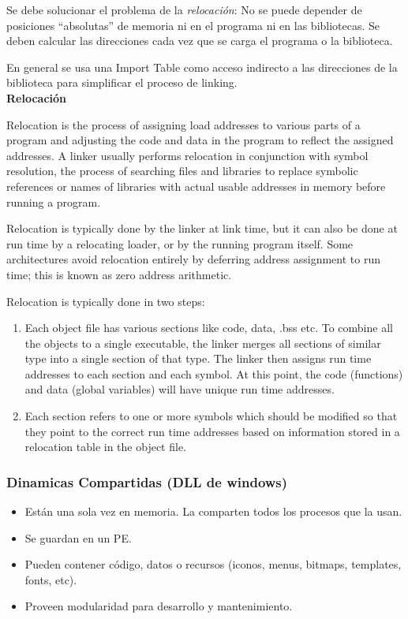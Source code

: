 \documentclass[a4paper, twoside]{article}
\begin{document}
Se debe solucionar el problema de la \emph{relocación}: No se puede depender de posiciones ``absolutas'' de memoria ni en el programa ni en las bibliotecas. Se deben calcular las direcciones cada vez que se carga el programa o la biblioteca.

En general se usa una Import Table como acceso indirecto a las direcciones de la biblioteca para simplificar el proceso de linking.\\

\textbf{Relocación}

Relocation is the process of assigning load addresses to various parts of a program and adjusting the code and data in the program to reflect the assigned addresses. A linker usually performs relocation in conjunction with symbol resolution, the process of searching files and libraries to replace symbolic references or names of libraries with actual usable addresses in memory before running a program.

Relocation is typically done by the linker at link time, but it can also be done at run time by a relocating loader, or by the running program itself. Some architectures avoid relocation entirely by deferring address assignment to run time; this is known as zero address arithmetic.

Relocation is typically done in two steps:
\begin{enumerate}
	\item Each object file has various sections like code, data, .bss etc. To combine all the objects to a single executable, the linker merges all sections of similar type into a single section of that type. The linker then assigns run time addresses to each section and each symbol. At this point, the code (functions) and data (global variables) will have unique run time addresses.
	\item Each section refers to one or more symbols which should be modified so that they point to the correct run time addresses based on information stored in a relocation table in the object file.
\end{enumerate}

\subsubsection{Dinamicas Compartidas (DLL de windows)}
\begin{itemize}
	\item Están una sola vez en memoria. La comparten todos los procesos que la usan. 
	\item Se guardan en un PE.
	\item Pueden contener código, datos o recursos (iconos, menus, bitmaps, templates, fonts, etc).
	\item Proveen modularidad para desarrollo y mantenimiento.
\end{itemize}
\end{document}
